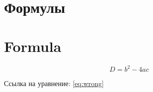 \documentclass{article}
\begin{document}
\section{Формулы}
\section{Formula}
\begin{equation}
    D = b^2-4ac
\end{equation}
\label{eq:wrong} %

Ссылка на уравнение: \ref{eq:wrong} 
\end{document}
